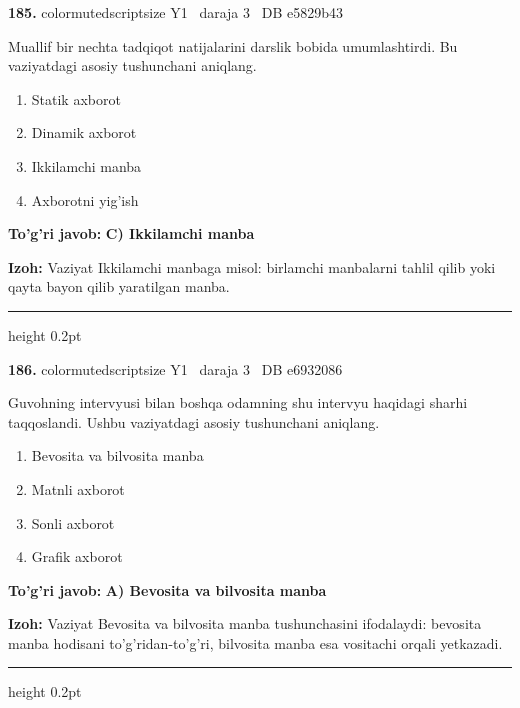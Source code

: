\documentclass[10pt,a4paper,oneside]{article}
\begin{document}
\noindent\textbf{\color{ink}185.}  {color{muted}scriptsize Y1 \textbullet\ daraja 3 \textbullet\ DB e5829b43}
\par
Muallif bir nechta tadqiqot natijalarini darslik bobida umumlashtirdi. Bu vaziyatdagi asosiy tushunchani aniqlang.
\begin{enumerate}[label=\Alph*),leftmargin=9mm]
\item Statik axborot
\item Dinamik axborot
\item Ikkilamchi manba
\item Axborotni yig'ish
\end{enumerate}
\begin{tcolorbox}[enhanced,breakable,colback=teal!4,colframe=teal!50!black,boxrule=0.5pt,arc=1.1mm,left=3mm,right=3mm,top=1.7mm,bottom=1.7mm,before skip=2mm,after skip=2mm]
\textbf{\color{teal}To'g'ri javob:} \textbf{C) Ikkilamchi manba}
\par\smallskip
\textbf{Izoh:} Vaziyat Ikkilamchi manbaga misol: birlamchi manbalarni tahlil qilib yoki qayta bayon qilib yaratilgan manba.
\end{tcolorbox}
\vspace{2mm}\hrule height 0.2pt \vspace{3mm}

\noindent\textbf{\color{ink}186.}  {color{muted}scriptsize Y1 \textbullet\ daraja 3 \textbullet\ DB e6932086}
\par
Guvohning intervyusi bilan boshqa odamning shu intervyu haqidagi sharhi taqqoslandi. Ushbu vaziyatdagi asosiy tushunchani aniqlang.
\begin{enumerate}[label=\Alph*),leftmargin=9mm]
\item Bevosita va bilvosita manba
\item Matnli axborot
\item Sonli axborot
\item Grafik axborot
\end{enumerate}
\begin{tcolorbox}[enhanced,breakable,colback=teal!4,colframe=teal!50!black,boxrule=0.5pt,arc=1.1mm,left=3mm,right=3mm,top=1.7mm,bottom=1.7mm,before skip=2mm,after skip=2mm]
\textbf{\color{teal}To'g'ri javob:} \textbf{A) Bevosita va bilvosita manba}
\par\smallskip
\textbf{Izoh:} Vaziyat Bevosita va bilvosita manba tushunchasini ifodalaydi: bevosita manba hodisani to'g'ridan-to'g'ri, bilvosita manba esa vositachi orqali yetkazadi.
\end{tcolorbox}
\vspace{2mm}\hrule height 0.2pt \vspace{3mm}
\end{document}
